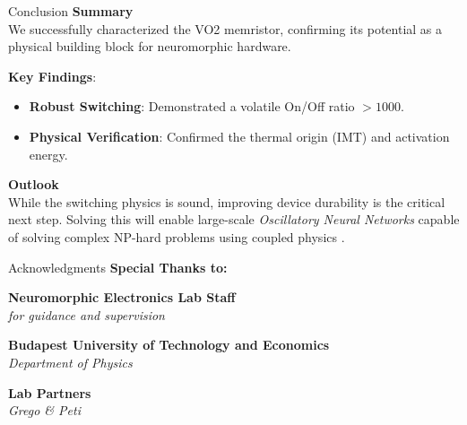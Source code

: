 \documentclass[aspectratio=169]{beamer}
\begin{document}
\begin{frame}{Conclusion}
    \textbf{Summary} \\
    \vspace{0.2cm}
    We successfully characterized the VO2 memristor, confirming its potential as a physical building block for neuromorphic hardware.
    
    \vspace{0.4cm}
    \textbf{Key Findings}:
    \vspace{0.2cm}
    \begin{itemize}
        \item \textbf{Robust Switching}: Demonstrated a volatile On/Off ratio $>1000$.
        \item \textbf{Physical Verification}: Confirmed the thermal origin (IMT) and activation energy.
    \end{itemize}
    
    \vspace{0.6cm}

    \textbf{Outlook} \\
    \vspace{0.2cm}
    While the switching physics is sound, improving device durability is the critical next step. Solving this will enable large-scale \textit{Oscillatory Neural Networks} capable of solving complex NP-hard problems using coupled physics \cite{maher}.
\end{frame}



\begin{frame}{Acknowledgments}
    \centering
    \large
    \textbf{Special Thanks to:}
    
    \vspace{1cm}
    
    \textbf{Neuromorphic Electronics Lab Staff} \\
    \textit{for guidance and supervision}
    
    \vspace{0.5cm}
    
    \textbf{Budapest University of Technology and Economics} \\
    \textit{Department of Physics}
    
    \vspace{0.5cm}
    
    \textbf{Lab Partners} \\
    \textit{Grego \& Peti}
\end{frame}
\end{document}
